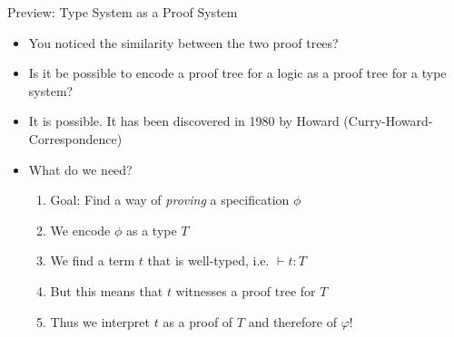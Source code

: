 \begin{frame}{Preview: Type System as a Proof System}
\begin{itemize}
\item You noticed the similarity between the two proof trees?
\item Is it be possible to encode a proof tree for a logic as a proof tree for a type system?

\pause

\item It is possible. It has been discovered in 1980 by Howard (Curry-Howard-Correspondence)

\pause

\item What do we need?
  \begin{enumerate}
		\item Goal: Find a way of \textit{proving} a specification $\phi$
		\item We encode $\phi$ as a type $T$
		\item We find a term $t$ that is well-typed, i.e. $⊢ t: T$
		\item But this means that $t$ witnesses a proof tree for $T$
		\item Thus we interpret $t$ as a proof of $T$ and therefore of $φ$!
  \end{enumerate}
\end{itemize}
\end{frame}


